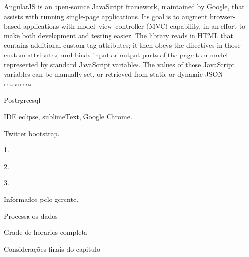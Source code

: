 \documentclass{abntpuc}
\begin{document}
	AngularJS is an open-source JavaScript framework, maintained by Google, that assists with running single-page applications. Its goal is to augment browser-based applications with model–view–controller (MVC) capability, in an effort to make both development and testing easier.
	The library reads in HTML that contains additional custom tag attributes; it then obeys the directives in those custom attributes, and binds input or output parts of the page to a model represented by standard JavaScript variables. The values of those JavaScript variables can be manually set, or retrieved from static or dynamic JSON resources.


Postrgreesql


IDE eclipse, sublimeText, Google Chrome.











Twitter bootstrap.\par


1.\par
2.\par
3.\par


Informados pelo gerente.


Processa os dados


Grade de horarios completa


Considerações finais do capitulo





\end{document}
